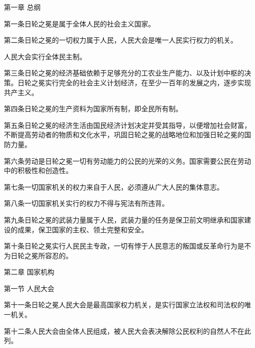 ﻿{\fangsong
\setlength{\parindent}{0pt}
\setlength{\parskip}{0.4\baselineskip}

\vspace{0.8\baselineskip}
\begin{center}
{\large 第一章\,\,总纲}
\end{center}
\vspace{0.6\baselineskip}

\noindent 第一条\quad 日轮之冕是属于全体人民的社会主义国家。

\noindent 第二条\quad 日轮之冕的一切权力属于人民，人民大会是唯一人民实行权力的机关。

人民大会实行全体民主制。

\noindent 第三条\quad 日轮之冕的经济基础依赖于足够充分的工农业生产能力、以及计划中枢的决策。日轮之冕实行完全的社会主义计划经济，在至少一百年的发展之内，逐步实现共产主义。

\noindent 第四条\quad 日轮之冕的生产资料为国家所有制，即全民所有制。

\noindent 第五条\quad 日轮之冕的经济生活由国民经济计划决定并受其指导，以便增加社会财富，不断提高劳动者的物质和文化水平，巩固日轮之冕的战略地位和加强日轮之冕的国防力量。

\noindent 第六条\quad 劳动是日轮之冕一切有劳动能力的公民的光荣的义务。国家需要公民在劳动中的积极性和创造性。

\noindent 第七条\quad 一切国家机关的权力来自于人民，必须遵从广大人民的集体意志。

\noindent 第八条\quad 一切国家机关实行的权力不得与宪法有所违背。

\noindent 第九条\quad 日轮之冕的武装力量属于人民，武装力量的任务是保卫前文明继承和国家建设的成果，保卫国家的主权、领土完整和安全。

\noindent 第十条\quad 日轮之冕实行人民民主专政，一切有悖于人民意志的叛国或反革命行为是不为日轮之冕所容忍的。

\vspace{0.8\baselineskip}
\begin{center}
{\large 第二章\,\,国家机构}
\end{center}
\vspace{0.6\baselineskip}

第一节\,\,人民大会

\vspace{0.6\baselineskip}

\noindent 第十一条\quad 日轮之冕人民大会是最高国家权力机关，是实行国家立法权和司法权的唯一机关。

\noindent 第十二条\quad 人民大会由全体人民组成，被人民大会表决解除公民权利的自然人不在此列。

}
